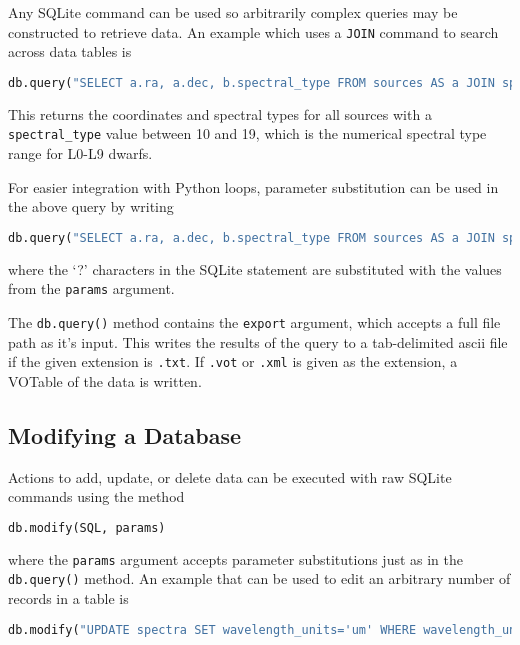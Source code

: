 \documentclass[iop,revtex4,natbib209]{emulateapj}
\begin{document}
Any SQLite command can be used so arbitrarily complex queries may be constructed to retrieve data. An example which uses a \texttt{JOIN} command to search across data tables is 

\begin{lstlisting}[language=Python]
db.query("SELECT a.ra, a.dec, b.spectral_type FROM sources AS a JOIN spectral_types AS b ON a.id=b.source_id WHERE b.spectral_type BETWEEN 10 and 19")
\end{lstlisting}

This returns the coordinates and spectral types for all sources with a \texttt{spectral\_type} value between 10 and 19, which is the numerical spectral type range for L0-L9 dwarfs.

For easier integration with Python loops, parameter substitution can be used in the above query by writing 

\begin{lstlisting}[language=Python]
db.query("SELECT a.ra, a.dec, b.spectral_type FROM sources AS a JOIN spectral_types AS b ON a.id=b.source_id WHERE b.spectral_type BETWEEN ? and ?", params=(20,29))
\end{lstlisting}

where the `?' characters in the SQLite statement are substituted with the values from the \texttt{params} argument.

The \texttt{db.query()} method contains the \texttt{export} argument, which accepts a full file path as it's input. This writes the results of the query to a tab-delimited ascii file if the given extension is \texttt{.txt}. If \texttt{.vot} or \texttt{.xml} is given as the extension, a VOTable of the data is written.

\subsection{Modifying a Database}{\label{sec:modify}}
Actions to add, update, or delete data can be executed with raw SQLite commands using the method

\begin{lstlisting}[language=Python]
db.modify(SQL, params)
\end{lstlisting}

where the \texttt{params} argument accepts parameter substitutions just as in the \texttt{db.query()} method. An example that can be used to edit an arbitrary number of records in a table is

\begin{lstlisting}[language=Python]
db.modify("UPDATE spectra SET wavelength_units='um' WHERE wavelength_units IN ('microns','UM')")
\end{lstlisting}
\end{document}
